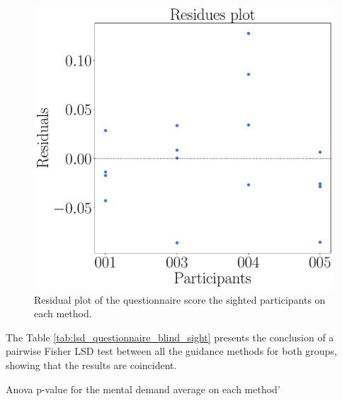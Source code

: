\begin{figure}[!htb]
\begin{minipage}{0.45\textwidth}
        \includegraphics[width = 0.8\linewidth]{Resultados/Questionario/Figuras/pdf/residplot_questionnaire_sight.pdf}
        \caption{Residual plot of the questionnaire score the sighted participants on each method.}
        \label{fig:residplot_questionnaire_sight}
    \end{minipage}
\end{figure}

The Table \ref{tab:lsd_questionnaire_blind_sight} presents the conclusion of a pairwise Fisher LSD test between all the guidance methods for both groups, showing that the results are coincident.

\begin{table}
    \caption{Anova p-value for the mental demand average on each method'}
    \label{tab:lsd_questionnaire_blind_sight}
\begin{minipage}{1\textwidth}
    
\end{minipage}
\begin{minipage}{1\textwidth}
    
\end{minipage}
\end{table}

%


\FloatBarrier